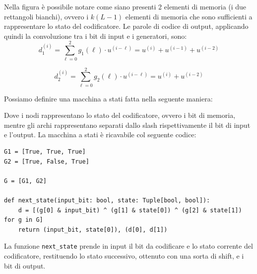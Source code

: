 Nella figura è possibile notare come siano presenti 2 elementi di memoria (i due rettangoli bianchi), ovvero i $k(L-1)$ elementi di memoria che sono sufficienti a rappresentare lo stato del codificatore.
Le parole di codice di output, applicando quindi la convoluzione tra i bit di input e i generatori, sono:
\[
    d_1^{\left(i\right)} = \sum_{\ell=0}^{2} g_1\left(\ell\right) \cdot u^{\left( i - \ell \right)} = u^{\left(i\right)} + u^{\left(i-1\right)} + u^{\left(i-2\right)}
\]

\[
    d_2^{\left(i\right)} = \sum_{\ell=0}^{2} g_2\left(\ell\right) \cdot u^{\left( i - \ell \right)} = u^{\left(i\right)} + u^{\left(i-2\right)}
\]

Possiamo definire una macchina a stati fatta nella seguente maniera:

\begin{center}
\end{center}


Dove i nodi rappresentano lo stato del codificatore, ovvero i bit di memoria, mentre gli archi rappresentano separati dallo slash rispettivamente il bit di input e l'output.
La macchina a stati è ricavabile col seguente codice:

\begin{verbatim}
G1 = [True, True, True]
G2 = [True, False, True]

G = [G1, G2]

def next_state(input_bit: bool, state: Tuple[bool, bool]):
    d = [(g[0] & input_bit) ^ (g[1] & state[0]) ^ (g[2] & state[1]) for g in G]
    return (input_bit, state[0]), (d[0], d[1])
\end{verbatim}

La funzione \texttt{next\_state} prende in input il bit da codificare e lo stato corrente del codificatore, restituendo lo stato successivo, ottenuto con una sorta di shift, e i bit di output.

